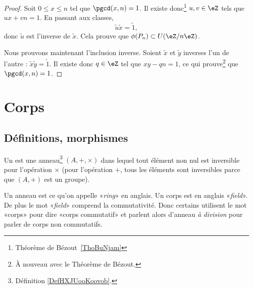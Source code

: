 \begin{proof}
    Soit \( 0\leq x\leq n\) tel que \( \pgcd(x,n)=1\). Il existe donc\footnote{Théorème de Bézout~\ref{ThoBuNjam}} \( u,v\in\eZ\) tels que \( ux+vn=1\). En passant aux classes,
    \begin{equation}
        \tilde u\tilde x=\tilde 1,
    \end{equation}
    donc \( \tilde u\) est l'inverse de \( \tilde x\). Cela prouve que \( \phi(P_n)\subset U(\eZ/n\eZ)\).

    Nous prouvons maintenant l'inclusion inverse. Soient \( \tilde x\) et \( \tilde y\) inverses l'un de l'autre : $\tilde x\tilde y=\tilde 1$. Il existe donc \( q\in\eZ\) tel que \( xy-qn=1\), ce qui prouve\footnote{À nouveau avec le Théorème de Bézout.} que \( \pgcd(x,n)=1\).
\end{proof}

\section{Corps}

\subsection{Définitions, morphismes}

\begin{definition}  \label{DefTMNooKXHUd}
    Un  est une anneau\footnote{Définition \ref{DefHXJUooKoovob}.} \( (A, +,\times)\) dans lequel tout élément non nul est inversible pour l'opération \( \times\) (pour l'opération \( +\), tous les éléments sont inversibles parce que \( (A,+)\) est un groupe).
\end{definition}

\begin{remark}      \label{REMooYRNUooYgBBKF}
    Un anneau est ce qu'on appelle «\emph{ring}» en anglais. Un corps est en anglais «\emph{field}». De plus le mot «\emph{field}» comprend la commutativité. Donc certains utilisent le mot «corps» pour dire «corps commutatif» et parlent alors d'anneau \emph{à division} pour parler de corps non commutatifs.
\end{remark}

